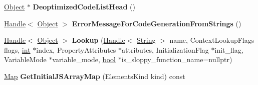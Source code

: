 \begin{DoxyCompactItemize}
\mbox{\hyperlink{classv8_1_1internal_1_1Object}{Object}} $\ast$ {\bfseries Deoptimized\+Code\+List\+Head} ()
\item 
\mbox{\label{classv8_1_1internal_1_1Context_a74c1859a9dab38be17728aaaa4d33285}} 
\mbox{\hyperlink{classv8_1_1internal_1_1Handle}{Handle}}$<$ \mbox{\hyperlink{classv8_1_1internal_1_1Object}{Object}} $>$ {\bfseries Error\+Message\+For\+Code\+Generation\+From\+Strings} ()
\item 
\mbox{\label{classv8_1_1internal_1_1Context_a8fe377541888162f0be0ce6d801e9d27}} 
\mbox{\hyperlink{classv8_1_1internal_1_1Handle}{Handle}}$<$ \mbox{\hyperlink{classv8_1_1internal_1_1Object}{Object}} $>$ {\bfseries Lookup} (\mbox{\hyperlink{classv8_1_1internal_1_1Handle}{Handle}}$<$ \mbox{\hyperlink{classv8_1_1internal_1_1String}{String}} $>$ name, Context\+Lookup\+Flags flags, \mbox{\hyperlink{classint}{int}} $\ast$index, Property\+Attributes $\ast$attributes, Initialization\+Flag $\ast$init\+\_\+flag, Variable\+Mode $\ast$variable\+\_\+mode, \mbox{\hyperlink{classbool}{bool}} $\ast$is\+\_\+sloppy\+\_\+function\+\_\+name=nullptr)
\item 
\mbox{\label{classv8_1_1internal_1_1Context_aaa76954dd7dfbe8af2b322176664ed45}} 
\mbox{\hyperlink{classv8_1_1internal_1_1Map}{Map}} {\bfseries Get\+Initial\+J\+S\+Array\+Map} (Elements\+Kind kind) const
\end{DoxyCompactItemize}
